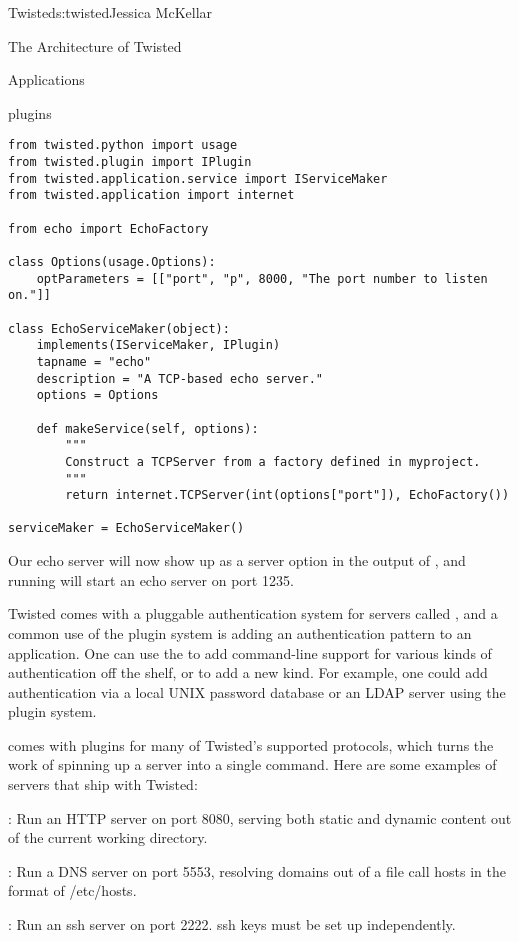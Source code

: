 \begin{aosachapter}{Twisted}{s:twisted}{Jessica McKellar}
\begin{aosasect1}{The Architecture of Twisted}
\begin{aosasect2}{Applications}
\begin{aosasect3}{plugins}
\begin{verbatim}
from twisted.python import usage
from twisted.plugin import IPlugin
from twisted.application.service import IServiceMaker
from twisted.application import internet

from echo import EchoFactory

class Options(usage.Options):
    optParameters = [["port", "p", 8000, "The port number to listen on."]]

class EchoServiceMaker(object):
    implements(IServiceMaker, IPlugin)
    tapname = "echo"
    description = "A TCP-based echo server."
    options = Options

    def makeService(self, options):
        """
        Construct a TCPServer from a factory defined in myproject.
        """
        return internet.TCPServer(int(options["port"]), EchoFactory())

serviceMaker = EchoServiceMaker()
\end{verbatim}

Our echo server will now show up as a server option in the output of
, and running 
will start an echo server on port 1235.

Twisted comes with a pluggable authentication system for servers called
, and a common use of the plugin system is adding an
authentication pattern to an application. One can use the  to add command-line support for various kinds of
authentication off the shelf, or to add a new kind. For example, one could add
authentication via a local UNIX password database or an LDAP server using the
plugin system.

 comes with plugins for many of Twisted's supported protocols,
which turns the work of spinning up a server into a single command. Here are
some examples of  servers that ship with Twisted:

\begin{aosaitemize}

\item {}:  Run an HTTP server on
  port 8080, serving both static and dynamic content out of the
  current working directory.

\item {}: Run a DNS server
  on port 5553, resolving domains out of a file call hosts in the
  format of /etc/hosts.

\item {}: Run an ssh server on port
  2222. ssh keys must be set up independently.


\end{aosaitemize}
\end{aosasect3}
\end{aosasect2}
\end{aosasect1}
\end{aosachapter}
